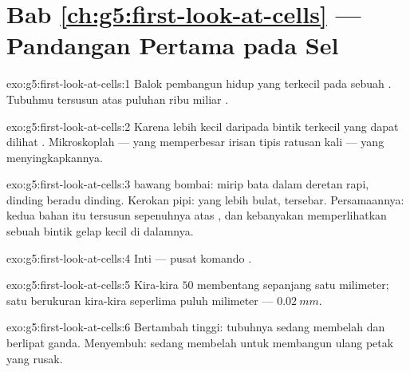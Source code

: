 \section*{Bab \ref{ch:g5:first-look-at-cells} --- Pandangan Pertama pada Sel}

\begin{solution}{exo:g5:first-look-at-cells:1}
Balok pembangun hidup yang terkecil pada sebuah . Tubuhmu
tersusun atas puluhan ribu miliar .
\end{solution}

\begin{solution}{exo:g5:first-look-at-cells:2}
Karena  lebih kecil daripada bintik terkecil yang dapat dilihat
. Mikroskoplah --- yang memperbesar irisan tipis ratusan kali ---
yang menyingkapkannya.
\end{solution}

\begin{solution}{exo:g5:first-look-at-cells:3}
 bawang bombai:  mirip bata dalam deretan rapi, dinding beradu
dinding. Kerokan pipi:  yang lebih bulat, tersebar. Persamaannya:
kedua bahan itu tersusun sepenuhnya atas , dan kebanyakan 
memperlihatkan sebuah bintik gelap kecil di dalamnya.
\end{solution}

\begin{solution}{exo:g5:first-look-at-cells:4}
Inti  --- pusat komando .
\end{solution}

\begin{solution}{exo:g5:first-look-at-cells:5}
Kira-kira $50$  membentang sepanjang satu milimeter; satu 
berukuran kira-kira seperlima puluh milimeter --- $\qty{0.02}{mm}$.
\end{solution}

\begin{solution}{exo:g5:first-look-at-cells:6}
Bertambah tinggi:  tubuhnya sedang membelah dan berlipat ganda.
Menyembuh:  sedang membelah untuk membangun ulang petak yang
rusak.
\end{solution}

